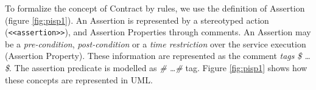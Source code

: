   
To formalize the concept of {\sc Contract} by rules, we use the definition of
{\sc Assertion} (figure \ref{fig:pisp1}). An {\sc Assertion} is represented by a
stereotyped action (\texttt{<<assertion>>}), and {\sc Assertion Properties}
through comments. An {\sc Assertion} may be a \textit{pre-condition},
\textit{post-condition} or a \textit{time restriction} over the service
execution ({\sc Assertion Property}). These information are represented as
the comment \textit{tags} \textit{\$ \ldots \$}. The assertion predicate is
modelled as \textit{\# \ldots \#} tag. Figure \ref{fig:pisp1} shows how these
concepts are represented in UML.



\begin{figure}[ht!]
  \centering
  ~ %
  \\

\end{figure}
